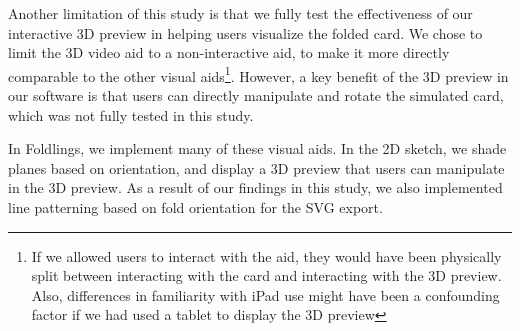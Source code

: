 Another limitation of this study is that we fully test the effectiveness
of our interactive 3D preview in helping users visualize the folded
card. We chose to limit the 3D video aid to a non-interactive aid, to
make it more directly comparable to the other visual aids\footnote{If we
  allowed users to interact with the aid, they would have been
  physically split between interacting with the card and interacting
  with the 3D preview. Also, differences in familiarity with iPad use
  might have been a confounding factor if we had used a tablet to
  display the 3D preview}. However, a key benefit of the 3D preview in
our software is that users can directly manipulate and rotate the
simulated card, which was not fully tested in this study.

In Foldlings, we implement many of these visual aids. In the 2D sketch,
we shade planes based on orientation, and display a 3D preview that
users can manipulate in the 3D preview. As a result of our findings in
this study, we also implemented line patterning based on fold
orientation for the SVG export.
